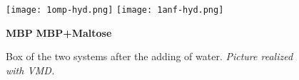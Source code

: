 \begin{itemize}

\begin{figure}[h]
\begin{center}
\begin{minipage}[t]{0.9\textwidth}
\centering
\hfill
\texttt{[image: 1omp-hyd.png]}
\hspace{0.5cm}
\texttt{[image: 1anf-hyd.png]}
\hfill
\end{minipage} 

\hspace{1cm}
\textbf{MBP}
\hspace{4.75cm}
\textbf{MBP+Maltose}

    \footnotesize{\caption{Box of the two systems after the adding of water. \textit{Picture realized with VMD.}}
    \label{fig:water-box}
    }
\end{center}
\end{figure}


\end{itemize}
